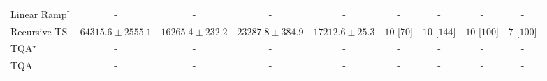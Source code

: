 \begin{tabular}{l|cccc|cccc|}
Linear Ramp$^\dagger$ & {\cellcolor[HTML]{000000}} \color[HTML]{F1F1F1} {\cellcolor{white}} \color{black} - & {\cellcolor[HTML]{000000}} \color[HTML]{F1F1F1} {\cellcolor{white}} \color{black} - & {\cellcolor[HTML]{000000}} \color[HTML]{F1F1F1} {\cellcolor{white}} \color{black} - & {\cellcolor[HTML]{000000}} \color[HTML]{F1F1F1} {\cellcolor{white}} \color{black} - & {\cellcolor[HTML]{000000}} \color[HTML]{F1F1F1} {\cellcolor{white}} \color{black} - & {\cellcolor[HTML]{000000}} \color[HTML]{F1F1F1} {\cellcolor{white}} \color{black} - & {\cellcolor[HTML]{000000}} \color[HTML]{F1F1F1} {\cellcolor{white}} \color{black} - & {\cellcolor[HTML]{000000}} \color[HTML]{F1F1F1} {\cellcolor{white}} \color{black} - \\
Recursive TS & {\cellcolor[HTML]{C44802}} \color[HTML]{F1F1F1} $64315.6\pm 2555.1$ & {\cellcolor[HTML]{FFFCD7}} \color[HTML]{000000} $16265.4\pm 232.2$ & {\cellcolor[HTML]{FFF3B4}} \color[HTML]{000000} $23287.8\pm 384.9$ & {\cellcolor[HTML]{FFFBD2}} \color[HTML]{000000} $17212.6\pm 25.3$ & {\cellcolor[HTML]{49006A}} \color[HTML]{F1F1F1} $10$ [$70$] & {\cellcolor[HTML]{49006A}} \color[HTML]{F1F1F1} $10$ [$144$] & {\cellcolor[HTML]{49006A}} \color[HTML]{F1F1F1} $10$ [$100$] & {\cellcolor[HTML]{CD238F}} \color[HTML]{F1F1F1} $7$ [$100$] \\
TQA$^\star$ & {\cellcolor[HTML]{000000}} \color[HTML]{F1F1F1} {\cellcolor{white}} \color{black} - & {\cellcolor[HTML]{000000}} \color[HTML]{F1F1F1} {\cellcolor{white}} \color{black} - & {\cellcolor[HTML]{000000}} \color[HTML]{F1F1F1} {\cellcolor{white}} \color{black} - & {\cellcolor[HTML]{000000}} \color[HTML]{F1F1F1} {\cellcolor{white}} \color{black} - & {\cellcolor[HTML]{000000}} \color[HTML]{F1F1F1} {\cellcolor{white}} \color{black} - & {\cellcolor[HTML]{000000}} \color[HTML]{F1F1F1} {\cellcolor{white}} \color{black} - & {\cellcolor[HTML]{000000}} \color[HTML]{F1F1F1} {\cellcolor{white}} \color{black} - & {\cellcolor[HTML]{000000}} \color[HTML]{F1F1F1} {\cellcolor{white}} \color{black} - \\
TQA & {\cellcolor[HTML]{000000}} \color[HTML]{F1F1F1} {\cellcolor{white}} \color{black} - & {\cellcolor[HTML]{000000}} \color[HTML]{F1F1F1} {\cellcolor{white}} \color{black} - & {\cellcolor[HTML]{000000}} \color[HTML]{F1F1F1} {\cellcolor{white}} \color{black} - & {\cellcolor[HTML]{000000}} \color[HTML]{F1F1F1} {\cellcolor{white}} \color{black} - & {\cellcolor[HTML]{000000}} \color[HTML]{F1F1F1} {\cellcolor{white}} \color{black} - & {\cellcolor[HTML]{000000}} \color[HTML]{F1F1F1} {\cellcolor{white}} \color{black} - & {\cellcolor[HTML]{000000}} \color[HTML]{F1F1F1} {\cellcolor{white}} \color{black} - & {\cellcolor[HTML]{000000}} \color[HTML]{F1F1F1} {\cellcolor{white}} \color{black} - \\

\end{tabular}
